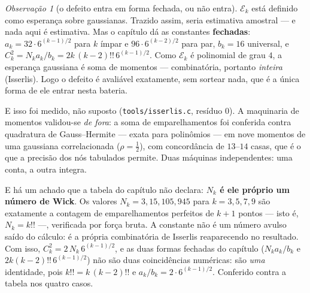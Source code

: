 \documentclass[11pt]{article}
\newcommand{\code}[1]{\texttt{\small #1}}
\theoremstyle{plain}
\theoremstyle{remark}
\newtheorem{obs}{Observação}
\begin{document}
\begin{obs}[o defeito entra em forma fechada, ou não entra]
$\mathcal E_k$ está definido como esperança sobre gaussianas. Trazido assim, seria estimativa
amostral --- e nada aqui é estimativa. Mas o capítulo dá as constantes \textbf{fechadas}:
$a_k=32\cdot6^{(k-1)/2}$ para $k$ ímpar e $96\cdot6^{(k-2)/2}$ para par, $b_k=16$ universal, e
$C_k^2=N_ka_k/b_k=2k\,(k-2)!!\,6^{(k-1)/2}$. Como $\mathcal E_k$ é polinomial de grau $4$, a
esperança gaussiana é soma de momentos --- combinatória, portanto \emph{inteira} (Isserlis). Logo o
defeito é avaliável exatamente, sem sortear nada, que é a única forma de ele entrar nesta bateria.

E isso foi medido, não suposto (\code{tools/isserlis.c}, resíduo $0$). A maquinaria de momentos
validou-se \emph{de fora}: a soma de emparelhamentos foi conferida contra quadratura de
Gauss--Hermite --- exata para polinômios --- em nove momentos de uma gaussiana correlacionada
($\rho=\tfrac12$), com concordância de $13$--$14$ casas, que é o que a precisão dos nós tabulados
permite. Duas máquinas independentes: uma conta, a outra integra.

E há um achado que a tabela do capítulo não declara: \textbf{$N_k$ é ele próprio um número de
Wick}. Os valores $N_k=3,15,105,945$ para $k=3,5,7,9$ são exatamente a contagem de emparelhamentos
perfeitos de $k+1$ pontos --- isto é, $N_k=k!!$ ---, verificada por força bruta. A constante não é
um número avulso saído do cálculo: é a própria combinatória de Isserlis reaparecendo no resultado.
Com isso, $C_k^2=2\,N_k\,6^{(k-1)/2}$, e as duas formas fechadas do capítulo
($N_ka_k/b_k$ e $2k(k-2)!!\,6^{(k-1)/2}$) não são duas coincidências numéricas: são \emph{uma}
identidade, pois $k!!=k\,(k-2)!!$ e $a_k/b_k=2\cdot6^{(k-1)/2}$. Conferido contra a tabela nos
quatro casos.
\end{obs}
\end{document}

